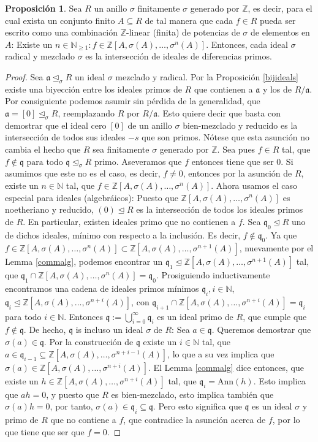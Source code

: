 \documentclass[12pt,a4paper,BCOR15mm,twoside,DIV12]{article}
\def\N{\mathbb{N}}
\def\NE{\mathbb{N}_{\geq 1}}
\def\Z{\mathbb{Z}}
\def\fa{\text{ para todo }}
\def\a{\mathfrak{a}}
\def\q{\mathfrak{q}}
\def\s{\sigma}
\def\si{\unlhd_{\sigma}}
\newenvironment{bew}{\begin{proof}[Proof]}{\end{proof}}
\theoremstyle{definition}
\newtheorem{prop}[Satz]{Proposici\'{o}n}
\begin{document}
\begin{prop}\label{mixedintersectionprimesfinite}
Sea $R$ un anillo $\s$ finitamente $\s$ generado por $\Z$, es decir, para el cual exista un conjunto finito $A \subseteq R$ de tal manera que cada $f \in R$ pueda ser escrito como una combinación $\Z$-linear (finita) de potencias de $\s$ de elementos en $A$: 
Existe un $n \in \NE: f \in \Z[A,\sigma(A),\ldots,\s^n(A)]$. Entonces, cada ideal $\s$ radical y mezclado $\s$ es la intersección de ideales de diferencias primos.
\begin{bew}
Sea $\a \si R$ un ideal $\s$ mezclado y radical. Por la Proposición \ref{bijideals} existe una biyección entre los ideales primos de $R$ que contienen a $\a$ y los de $R/\a$. Por consiguiente podemos asumir sin pérdida de la generalidad, que $\a = [0] \si R$,
reemplazando $R$ por $R/\a$. Esto quiere decir que basta con demostrar que el ideal cero $[0]$ de un anillo $\s$ bien-mezclado y reducido es la intersección de todos sus ideales $-s$ que son primos.
Nótese que esta asunción no cambia el hecho que $R$ sea finitamente $\s$ generado por $\Z$.
Sea pues $f \in R$ tal, 
que $f \notin \q \fa \q \si R$ primo. Aseveramos que $f$ entonces tiene que ser $0$. Si asumimos que este no es el caso, es decir, $f \neq 0$, entonces por la asunción de $R$, existe un $n \in \N$ tal, que $f \in \Z[A,\s(A),\ldots,\s^n(A)]$.
Ahora usamos el caso especial para ideales (algebráicos): Puesto que $\Z[A,\s(A),\ldots,\s^n(A)]$ es noetheriano y reducido, $(0) \unlhd R$ es la intersección de todos los ideales primos de $R$. En particular, existen ideales primo que no contienen a $f$.
Sea $\q_0 \unlhd R$ uno de dichos ideales, mínimo con respecto a la inclusión. Es decir, $f \notin \q_0$. Ya que $f \in \Z[A,\s(A),\ldots,\s^n(A)] \subset \Z[A,\s(A),\ldots,\s^{n+1}(A)]$, nuevamente por el Lemma \ref{commalg}, 
podemos encontrar un $\q_1 \unlhd \Z[A,\s(A),\ldots,\s^{n+1}(A)]$ tal, que $\q_1 \cap \Z[A,\s(A),\ldots,\s^{n}(A)] = \q_0$. Prosiguiendo inductivamente encontramos una cadena de ideales primos mínimos
 $\q_i, i \in \N$, $\q_i \unlhd \Z[A,\s(A),\ldots,\s^{n+i}(A)]$, con $\q_{i+1} \cap \Z[A,\s(A),\ldots,\s^{n+i}(A)] = \q_i$ para todo $i \in \N$.
Entonces $\q := \bigcup_{i=0}^{\infty} \q_i$ es un ideal primo de $R$, que cumple que $f \notin \q$. De hecho, $\q$ is incluso un ideal $\s$ de $R$: Sea $a \in \q$. Queremos demostrar que  $\s(a) \in \q$.  
Por la construcción de $\q$ existe un $i \in \N$ tal, que $a \in \q_{i-1} \subseteq \Z[A,\s(A),\ldots,\s^{n+i-1}(A)]$, lo que a su vez implica que $\s(a) \in \Z[A,\s(A),\ldots,\s^{n+i}(A)]$. 
El Lemma \ref{commalg} dice entonces, que existe un $h \in \Z[A,\s(A),\ldots,\s^{n+i}(A)]$ tal, que $ \q_i = \text{Ann}(h)$.
Esto implica que $ah = 0$, y puesto que $R$ es bien-mezclado, esto implica también que $\s(a)h = 0$, por tanto, $\s(a) \in \q_i \subseteq \q$. 
Pero esto significa que  $\q$ es un ideal $\s$ y primo de $R$ que no contiene a $f$, que contradice la asunción acerca de $f$, por lo que tiene que ser que $f = 0$.
\end{bew}
\end{prop}
\end{document}
